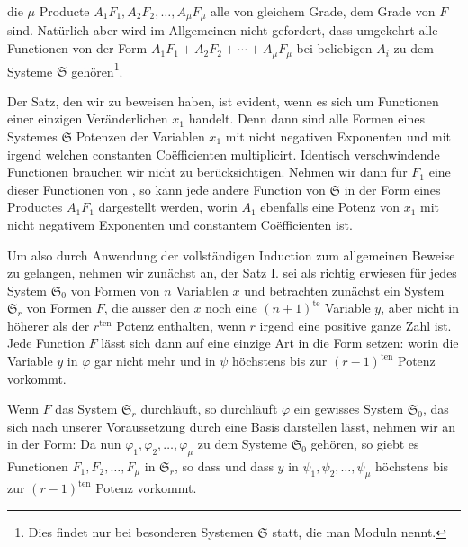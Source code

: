 die $\mu$ Producte $A_1F_1, A_2F_2, \ldots, A_\mu F_\mu$ alle von gleichem Grade, dem Grade von $F$ sind. Nat\"urlich aber wird im Allgemeinen nicht gefordert, dass umgekehrt alle Functionen von der Form $A_1F_1+A_2F_2+\cdots+A_\mu F_\mu$ bei beliebigen $A_i$ zu dem Systeme $\mathfrak S$ geh\"oren\footnote{Dies findet nur bei besonderen Systemen $\mathfrak S$ statt, die man Moduln nennt.}.

Der Satz, den wir zu beweisen haben, ist evident, wenn es sich um Functionen einer einzigen Ver\"anderlichen $x_1$ handelt. Denn dann sind alle Formen eines Systemes $\mathfrak S$ Potenzen der Variablen $x_1$ mit nicht negativen Exponenten und mit irgend welchen constanten Co\"efficienten multiplicirt. Identisch verschwindende Functionen brauchen wir nicht zu ber\"ucksichtigen. Nehmen wir dann f\"ur $F_1$ eine dieser Functionen von , so kann jede andere Function von $\mathfrak S$ in der Form eines Productes $A_1F_1$ dargestellt werden, worin $A_1$ ebenfalls eine Potenz von $x_1$ mit nicht negativem Exponenten und constantem Co\"efficienten ist.

Um also durch Anwendung der vollst\"andigen Induction zum allgemeinen Beweise zu gelangen, nehmen wir zun\"achst an, der Satz I. sei als richtig erwiesen f\"ur jedes System $\mathfrak S_0$ von Formen von $n$ Variablen $x$ und betrachten zun\"achst ein System $\mathfrak S_r$ von Formen $F$, die ausser den $x$ noch eine $(n+1)^{\text{te}}$ Variable $y$, aber nicht in h\"oherer als der $r^{\text{ten}}$ Potenz enthalten, wenn $r$ irgend eine positive ganze Zahl ist. Jede Function $F$ l\"asst sich dann auf eine einzige Art in die Form setzen:
worin die Variable $y$ in $\varphi$ gar nicht mehr und in $\psi$ h\"ochstens bis zur $(r-1)^{\text{ten}}$ Potenz vorkommt.

Wenn $F$ das System $\mathfrak S_r$ durchl\"auft, so durchl\"auft $\varphi$ ein gewisses System $\mathfrak S_0$, das sich nach unserer Voraussetzung durch eine Basis darstellen l\"asst, nehmen wir an in der Form:
Da nun $\varphi_1,\varphi_2,\ldots,\varphi_\mu$ zu dem Systeme $\mathfrak S_0$ geh\"oren, so giebt es Functionen $F_1, F_2,\ldots,F_\mu$ in $\mathfrak S_r$, so dass
und dass $y$ in $\psi_1,\psi_2,\ldots,\psi_\mu$ h\"ochstens bis zur $(r-1)^{\text{ten}}$ Potenz vorkommt.
